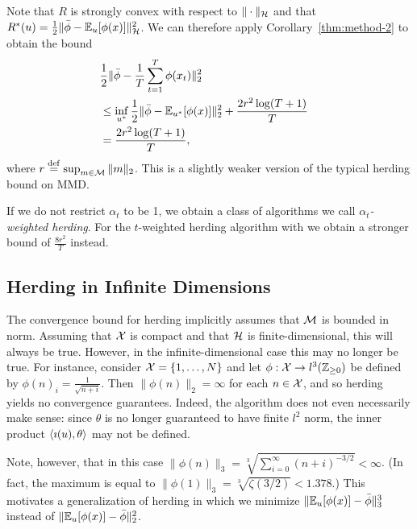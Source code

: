 \documentclass[paper.tex]{subfiles}
\begin{document}
Note that $R$ is strongly convex with respect to $\|\cdot\|_{\mathcal{H}}$ and that 
$R^*(u) = \frac{1}{2}\|\bar{\phi}-\mathbb{E}_{u}[\phi(x)]\|_{\mathcal{H}}^2$. We can 
therefore apply Corollary~\ref{thm:method-2} to obtain the bound
\begin{align*}
\lefteqn{\frac{1}{2}\|\bar{\phi}-\frac{1}{T}\sum_{t=1}^T \phi(x_t)\|_2^2} \\
 &\leq \inf_{u^*} \frac{1}{2}\|\bar{\phi}-\bE_{u^*}[\phi(x)]\|_2^2 + \frac{2r^2\log(T+1)}{T} \\
 &= \frac{2r^2\log(T+1)}{T},
\end{align*}
where $r \stackrel{\mathrm{def}}{=} \sup_{m \in \mathcal{M}} \|m\|_2$. This is a slightly weaker 
version of the typical herding bound on MMD.

If we do not restrict $\alpha_{t}$ to be 1, we obtain a class of algorithms
we call {\em $\alpha_{t}$-weighted herding}. For the $t$-weighted herding 
algorithm with we obtain a stronger bound of $\frac{8r^2}{T}$ instead.

\subsection{Herding in Infinite Dimensions}
\label{sec:infinite-case}

The convergence bound for herding implicitly assumes that 
$\mathcal{M}$ is bounded in norm. Assuming that $\mathcal{X}$ is compact 
and that $\mathcal{H}$ is finite-dimensional, this will always be true. However, in 
the infinite-dimensional case this may no longer be true. 
For instance, consider $\mathcal{X} = \{1,\ldots,N\}$ and let 
$\phi : \mathcal{X} \to l^3(\mathbb{Z}_{\geq 0})$ be
defined by $\phi(n)_i = \frac{1}{\sqrt{n+i}}$. Then 
$\|\phi(n)\|_2 = \infty$ for each $n \in \mathcal{X}$, and so herding 
yields no convergence guarantees. Indeed, the algorithm 
does not even necessarily make sense: since $\theta$ is 
no longer guaranteed to have finite $l^2$ norm, the 
inner product $\left\langle \imath(u), \theta \right\rangle$ may not be defined.

Note, however, that in this case
$\|\phi(n)\|_3 = \sqrt[3]{\sum_{i=0}^{\infty} (n+i)^{-3/2}} < \infty$.
(In fact, the maximum is equal to
$\|\phi(1)\|_3 = \sqrt[3]{\zeta(3/2)} < 1.378$.) This motivates 
a generalization of herding in which we minimize 
$\|\mathbb{E}_{u}[\phi(x)]-\bar{\phi}\|_3^3$ instead of 
$\|\mathbb{E}_{u}[\phi(x)]-\bar{\phi}\|_2^2$.
\end{document}

